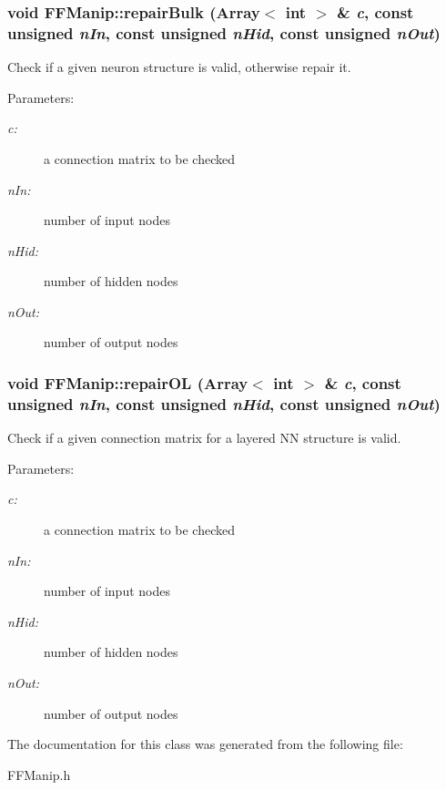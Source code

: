 \subsubsection{\setlength{\rightskip}{0pt plus 5cm}void FFManip::repair\-Bulk (Array$<$ int $>$ \& {\em c}, const unsigned {\em n\-In}, const unsigned {\em n\-Hid}, const unsigned {\em n\-Out})\hspace{0.3cm}{\tt  [protected]}}\label{classFFManip_b2}


Check if a given neuron structure is valid, otherwise repair it.

\begin{Desc}
\item[Parameters: ]\par
\begin{description}
\item[{\em 
c:}]a connection matrix to be checked \item[{\em 
n\-In:}]number of input nodes \item[{\em 
n\-Hid:}]number of hidden nodes \item[{\em 
n\-Out:}]number of output nodes \end{description}
\end{Desc}
\subsubsection{\setlength{\rightskip}{0pt plus 5cm}void FFManip::repair\-OL (Array$<$ int $>$ \& {\em c}, const unsigned {\em n\-In}, const unsigned {\em n\-Hid}, const unsigned {\em n\-Out})\hspace{0.3cm}{\tt  [protected]}}\label{classFFManip_b3}


Check if a given connection matrix for a layered NN structure is valid.

\begin{Desc}
\item[Parameters: ]\par
\begin{description}
\item[{\em 
c:}]a connection matrix to be checked \item[{\em 
n\-In:}]number of input nodes \item[{\em 
n\-Hid:}]number of hidden nodes \item[{\em 
n\-Out:}]number of output nodes \end{description}
\end{Desc}


The documentation for this class was generated from the following file:\begin{CompactItemize}
\item 
FFManip.h\end{CompactItemize}
